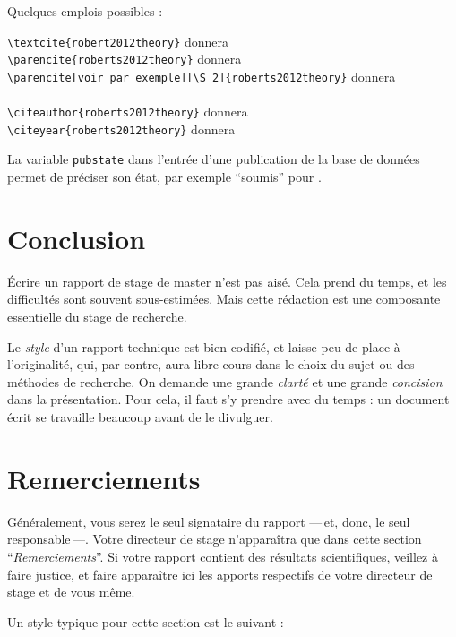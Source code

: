 \documentclass{ipgpmaster}
\begin{document}
 Quelques emplois possibles :

\verb"\textcite{robert2012theory}"  donnera \textcite{roberts2012theory}  \\
\verb"\parencite{roberts2012theory}"  donnera \parencite{roberts2012theory}  \\
\verb"\parencite[voir par exemple][\S 2]{roberts2012theory}"  donnera \\
\hspace*{1cm}\parencite[voir par exemple][\S 2]{roberts2012theory}  \\
\verb"\citeauthor{roberts2012theory}"  donnera \citeauthor{roberts2012theory}  \\
\verb"\citeyear{roberts2012theory}"  donnera \citeyear{roberts2012theory}  

La variable \texttt{pubstate} dans l'entrée d'une publication de la base de données permet de préciser son état, par exemple
``soumis'' pour \textcite{frezatsoumis}. 

\section{Conclusion}

Écrire un rapport de stage de master n'est pas aisé. 
Cela prend du temps, et les difficultés sont souvent sous-estimées.
Mais cette rédaction est une composante essentielle du stage de recherche.

Le \emph{style\/} d'un rapport technique est bien codifié, et laisse peu de place
à l'originalité, qui, par contre, aura libre cours dans le choix du sujet
ou des méthodes de recherche. On demande une grande \emph{ clarté\/} et une grande 
\emph{concision\/} dans la présentation. 
Pour cela, il faut s'y prendre avec du temps : un document écrit se travaille 
beaucoup avant de le divulguer.

\section{Remerciements}

Généralement, vous serez le seul signataire du rapport ---\,et, donc, le seul 
responsable\,---.
Votre directeur de stage n'apparaîtra que dans cette section 
``\emph{Remerciements\/}''. 
Si votre rapport contient des résultats scientifiques, veillez à faire justice, 
et faire apparaître ici les apports respectifs de votre directeur de stage
et de vous même.

Un style typique pour cette section est le suivant :
\end{document}
